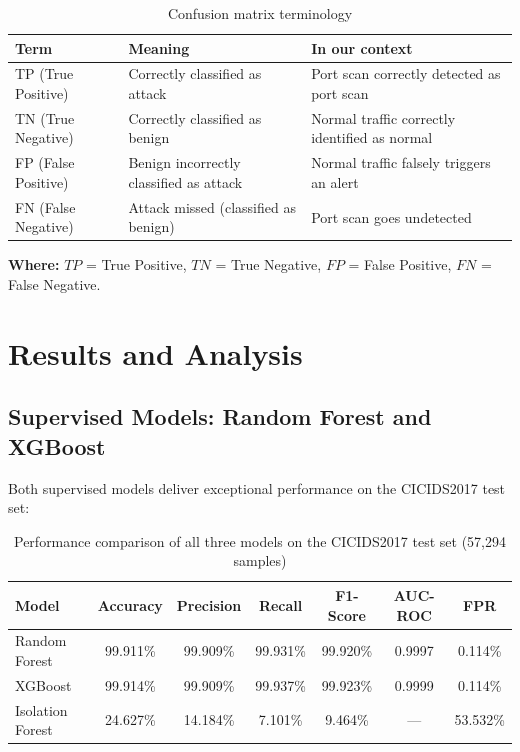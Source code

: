\begin{table}[H]
\centering
\caption{Confusion matrix terminology}
\label{tab:cm_terms}
\begin{tabular}{llp{7cm}}
\toprule
\textbf{Term} & \textbf{Meaning} & \textbf{In our context} \\
\midrule
TP (True Positive) & Correctly classified as attack & Port scan correctly detected as port scan \\
TN (True Negative) & Correctly classified as benign & Normal traffic correctly identified as normal \\
FP (False Positive) & Benign incorrectly classified as attack & Normal traffic falsely triggers an alert \\
FN (False Negative) & Attack missed (classified as benign) & Port scan goes undetected \\
\bottomrule
\end{tabular}
\end{table}

\noindent\textbf{Where:} $TP$ = True Positive, $TN$ = True Negative, $FP$ = False Positive, $FN$ = False Negative.

\section{Results and Analysis}

\subsection{Supervised Models: Random Forest and XGBoost}

Both supervised models deliver exceptional performance on the CICIDS2017 test set:

\begin{table}[H]
\centering
\caption{Performance comparison of all three models on the CICIDS2017 test set (57,294 samples)}
\label{tab:results}
\begin{tabular}{lcccccc}
\toprule
\textbf{Model} & \textbf{Accuracy} & \textbf{Precision} & \textbf{Recall} & \textbf{F1-Score} & \textbf{AUC-ROC} & \textbf{FPR} \\
\midrule
Random Forest & 99.911\% & 99.909\% & 99.931\% & 99.920\% & 0.9997 & 0.114\% \\
XGBoost & 99.914\% & 99.909\% & 99.937\% & 99.923\% & 0.9999 & 0.114\% \\
Isolation Forest & 24.627\% & 14.184\% & 7.101\% & 9.464\% & --- & 53.532\% \\
\bottomrule
\end{tabular}
\end{table}

